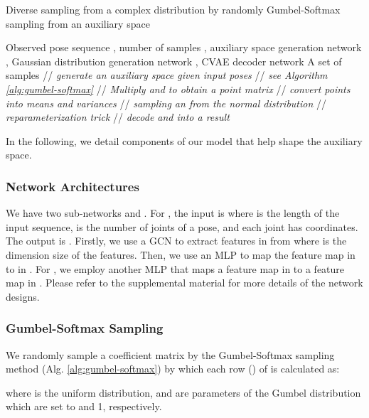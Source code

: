\documentclass[sigconf,screen,nonacm]{acmart}
\begin{document}
	\begin{algorithm}[!t]
		\caption{Diverse sampling from a complex distribution by randomly Gumbel-Softmax sampling from an auxiliary space}\label{alg:our-sampling-process}
		\begin{algorithmic}[1]
			\Require Observed pose sequence , number of samples , auxiliary space generation network , Gaussian distribution generation network , CVAE decoder network 
			\Ensure A set of samples 
			\State  // \textit{generate an auxiliary space given input poses}
			\State  // \textit{see \rm{Algorithm} \ref{alg:gumbel-softmax}}
			\State  // \textit{Multiply  and  to obtain a point matrix }
			\State  // \textit{convert points into means and variances}
			\State  // \textit{sampling an  from the normal distribution}
			\State  // \textit{reparameterization trick}
			\State  // \textit{decode  and  into a result }
			\EndFor 
		\end{algorithmic}
	\end{algorithm}
	
	
	In the following, we detail components of our model that help shape the auxiliary space.
	
	\subsubsection{Network Architectures}
	We have two sub-networks  and . For , the input is  where  is the length of the input sequence,  is the number of joints of a pose, and each joint has  coordinates. The output is . Firstly, we use a GCN \cite{mao2019learning} to extract features in  from  where  is the dimension size of the features. Then, we use an MLP to map the feature map in  to  in . For , we employ another MLP that maps a feature map in  to a feature map in . Please refer to the supplemental material for more details of the network designs.
	
	\subsubsection{Gumbel-Softmax Sampling}
	We randomly sample a coefficient matrix  by the Gumbel-Softmax sampling method (Alg. \ref{alg:gumbel-softmax}) by which each row  () of  is calculated as:
	 
	where  is the uniform distribution,  and  are parameters of the Gumbel distribution which are set to  and 1, respectively. 

	
	
\end{document}
